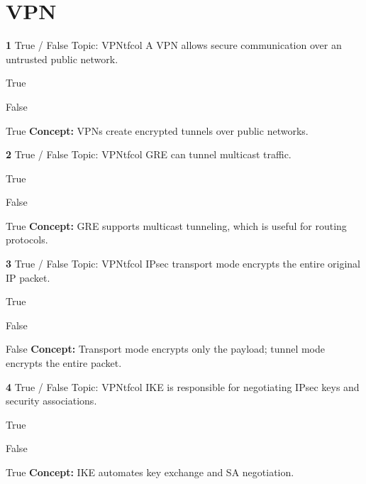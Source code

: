 \documentclass[10pt,a4paper]{article}
\begin{document}
\section{VPN}
\begin{qcard}{\color{white}\textbf{1} \hfill \small True / False \textbar{} Topic: VPN}{tfcol}
A VPN allows secure communication over an untrusted public network.

\begin{qoptions}
\item True
\item False
\end{qoptions}
\begin{explainbox}{True}
\textbf{Concept:} VPNs create encrypted tunnels over public networks.
\end{explainbox}
\end{qcard}

\begin{qcard}{\color{white}\textbf{2} \hfill \small True / False \textbar{} Topic: VPN}{tfcol}
GRE can tunnel multicast traffic.

\begin{qoptions}
\item True
\item False
\end{qoptions}
\begin{explainbox}{True}
\textbf{Concept:} GRE supports multicast tunneling, which is useful for routing protocols.
\end{explainbox}
\end{qcard}

\begin{qcard}{\color{white}\textbf{3} \hfill \small True / False \textbar{} Topic: VPN}{tfcol}
IPsec transport mode encrypts the entire original IP packet.

\begin{qoptions}
\item True
\item False
\end{qoptions}
\begin{explainbox}{False}
\textbf{Concept:} Transport mode encrypts only the payload; tunnel mode encrypts the entire packet.
\end{explainbox}
\end{qcard}

\begin{qcard}{\color{white}\textbf{4} \hfill \small True / False \textbar{} Topic: VPN}{tfcol}
IKE is responsible for negotiating IPsec keys and security associations.

\begin{qoptions}
\item True
\item False
\end{qoptions}
\begin{explainbox}{True}
\textbf{Concept:} IKE automates key exchange and SA negotiation.
\end{explainbox}
\end{qcard}
\end{document}
